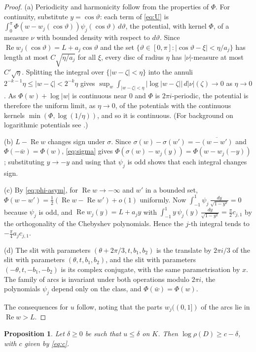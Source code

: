 \documentclass[11pt]{amsart}
\newtheorem{proposition}{Proposition}[section]
\theoremstyle{remark}
\newcommand{\re}{\operatorname{Re}}
\newcommand{\dmu}{\frac{dy}{\sqrt{1-y^2}}}
\begin{document}
\begin{proof}
(a) Periodicity and harmonicity follow from the properties of $\Phi$. For continuity, substitute
$y=\cos\vartheta$: each term of \eqref{eq:U} is $\int_0^\pi\Phi(w-w_j(\cos\vartheta))\psi_j(\cos\vartheta)\,d\vartheta$,
the potential, with kernel $\Phi$, of a measure $\nu$ with bounded density with respect to $d\vartheta$. Since
$\re w_j(\cos\vartheta)=L+a_j\cos\vartheta$ and the set $\{\vartheta\in[0,\pi]:|\cos\vartheta-\xi|<\eta/a_j\}$ has
length at most $C\sqrt{\eta/a_j}$ for all $\xi$, every disc of radius $\eta$ has $|\nu|$-measure at most
$C'\sqrt\eta$.
Splitting the integral over $\{|w-\zeta|<\eta\}$ into the annuli $2^{-k-1}\eta\le|w-\zeta|<2^{-k}\eta$ gives
$\sup_w\int_{|w-\zeta|<\eta}\bigl|\log|w-\zeta|\bigr|\,d|\nu|(\zeta)\to0$ as $\eta\to0$. As $\Phi(w)+\log|w|$ is
continuous near $0$ and $\Phi$ is $2\pi i$-periodic, the potential is therefore the uniform limit, as $\eta\to0$,
of the potentials with the continuous kernels $\min(\Phi,\log(1/\eta))$, and so it is continuous. (For background on logarithmic potentials
see \cite{Rans}.)

(b) $L-\re w$ changes sign under $\sigma$. Since $\sigma(w)-\sigma(w')=-\overline{(w-w')}$ and
$\Phi(-\bar w)=\Phi(w)$, \eqref{eq:sigma} gives $\Phi(\sigma(w)-w_j(y))=\Phi(w-w_j(-y))$; substituting
$y\to-y$ and using that $\psi_j$ is odd shows that each integral changes sign.

(c) By \eqref{eq:phi-asym}, for $\re w\to-\infty$ and $w'$ in a bounded set,
$\Phi(w-w')=\tfrac12(\re w-\re w')+o(1)$ uniformly. Now $\int_{-1}^1\psi_j\,\dmu=0$ because $\psi_j$ is odd, and
$\re w_j(y)=L+a_jy$ with $\int_{-1}^1y\,\psi_j(y)\,\dmu=\tfrac\pi2c_{j,1}$ by the orthogonality of the Chebyshev
polynomials. Hence the $j$-th integral tends to $-\tfrac\pi4a_jc_{j,1}$.

(d) The slit with parameters $(\theta+2\pi/3,t,b_1,b_2)$ is the translate by $2\pi i/3$ of the slit with
parameters $(\theta,t,b_1,b_2)$, and the slit with parameters $(-\theta,t,-b_1,-b_2)$ is its complex conjugate,
with the same parametrisation by $x$. The family of arcs is invariant under both operations modulo $2\pi i$, the
polynomials $\psi_j$ depend only on the class, and $\Phi(\bar w)=\Phi(w)$.

The consequences for $u$ follow, noting that the parts $w_j((0,1])$ of the arcs lie in $\re w>L$.
\end{proof}

\begin{proposition}\label{prop:criterion}
Let $\delta\ge0$ be such that $u\le\delta$ on $K$. Then $\log\rho(D)\ge c-\delta$, with $c$ given by \eqref{eq:c}.
\end{proposition}
\end{document}
